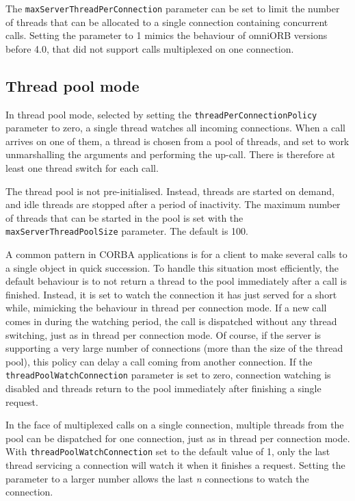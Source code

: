 \documentclass[11pt,oneside,a4paper]{book}
\newcommand{\code}[1]{\texttt{#1}}
\newcommand{\dsc}{\discretionary{}{}{}}
\begin{document}
The \code{maxServerThreadPerConnection} parameter can be set to limit
the number of threads that can be allocated to a single connection
containing concurrent calls. Setting the parameter to 1 mimics the
behaviour of omniORB versions before 4.0, that did not support
calls multiplexed on one connection.


\subsection{Thread pool mode}
\label{sec:watchConn}

In thread pool mode, selected by setting the
\code{threadPerConnectionPolicy} parameter to zero, a single thread
watches all incoming connections. When a call arrives on one of them,
a thread is chosen from a pool of threads, and set to work
unmarshalling the arguments and performing the up-call. There is
therefore at least one thread switch for each call.

The thread pool is not pre-initialised. Instead, threads are started
on demand, and idle threads are stopped after a period of inactivity.
The maximum number of threads that can be started in the pool is set
with the \code{maxServer\dsc{}ThreadPoolSize} parameter. The default
is 100.

A common pattern in CORBA applications is for a client to make several
calls to a single object in quick succession. To handle this situation
most efficiently, the default behaviour is to not return a thread to
the pool immediately after a call is finished. Instead, it is set to
watch the connection it has just served for a short while, mimicking
the behaviour in thread per connection mode. If a new call comes in
during the watching period, the call is dispatched without any thread
switching, just as in thread per connection mode. Of course, if the
server is supporting a very large number of connections (more than the
size of the thread pool), this policy can delay a call coming from
another connection. If the \code{threadPoolWatch\dsc{}Connection}
parameter is set to zero, connection watching is disabled and threads
return to the pool immediately after finishing a single request.

In the face of multiplexed calls on a single connection, multiple
threads from the pool can be dispatched for one connection, just as in
thread per connection mode. With \code{threadPoolWatchConnection} set
to the default value of 1, only the last thread servicing a connection
will watch it when it finishes a request. Setting the parameter to a
larger number allows the last \emph{n} connections to watch the
connection.
\end{document}
